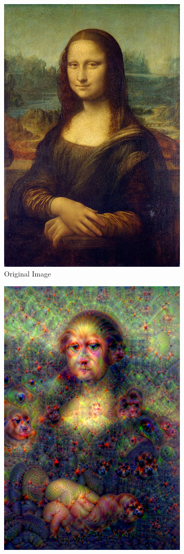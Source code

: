 \begin{figure}
    \captionsetup{justification=centering}

    \begin{subfigure}[t]{0.45\textwidth}
        \captionsetup{justification=centering}
        \centering
        \includegraphics[width=.7\linewidth]{figuras/feat_vis/experiments/non_random/mona.jpg}
        \caption{Original Image}
    \end{subfigure}
    \hfill
    \begin{subfigure}[t]{0.45\textwidth}
        \captionsetup{justification=centering}
        \centering
        \includegraphics[width=.7\linewidth]{figuras/feat_vis/experiments/non_random/mona_li24_lr7e-2_pl4.png}

\end{subfigure}
\end{figure}

